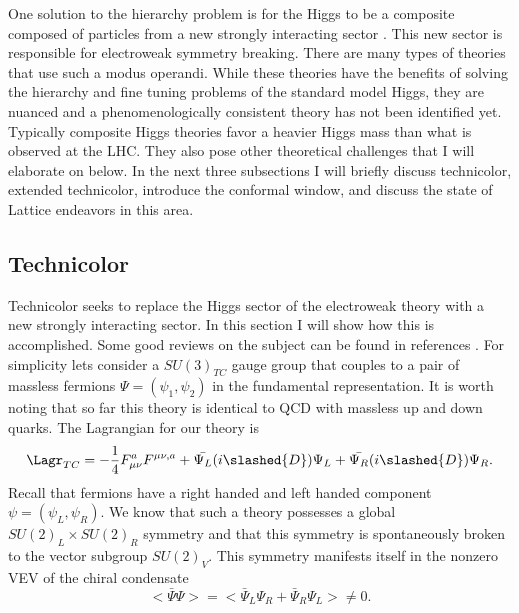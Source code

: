 
One solution to the hierarchy problem is for the Higgs to be a composite composed of particles from a new strongly interacting sector \cite{Kaplan:1983sm,Georgi:1984af,Weinberg:1975gm,Susskind:1978ms, Weinberg:1979bn, Eichten:1979ah, Dimopoulos:1979es}.
This new sector is responsible for electroweak symmetry breaking.
There are many types of theories that use such a modus operandi.
While these theories have the benefits of solving the hierarchy and fine tuning problems of the standard model Higgs, they are nuanced and a phenomenologically consistent theory has not been identified yet.
Typically composite Higgs theories favor a heavier Higgs mass than what is observed at the LHC.
They also pose other theoretical challenges that I will elaborate on below.
In the next three subsections I will briefly discuss technicolor, extended technicolor, introduce the conformal window, and discuss the state of Lattice endeavors in this area.

\subsection{Technicolor}

Technicolor seeks to replace the Higgs sector of the electroweak theory with a new strongly interacting sector.
In this section I will show how this is accomplished.
Some good reviews on the subject can be found in references \cite{Hill2003235,lane,Shrock:2007km,martin,Sannino:2009za}.
For simplicity lets consider a $SU(3)_{TC}$ gauge group that couples to a pair of massless fermions $\Psi=(\psi_1,\psi_2)$ in the fundamental representation.
It is worth noting that so far this theory is identical to QCD with massless up and down quarks.
The Lagrangian for our theory is
\begin{equation}
  \begin{aligned}
    \Lagr_{TC}=-\frac{1}{4}F^a_{\mu\nu}F^{\mu\nu,a}+\bar{\Psi_L}(i\slashed{D})\Psi_L+\bar{\Psi_R}(i\slashed{D})\Psi_R.
  \end{aligned}
\end{equation}
Recall that fermions have a right handed and left handed component $\psi=(\psi_L,\psi_R)$.
We know that such a theory possesses a global $SU(2)_L\times SU(2)_R$ symmetry and that this symmetry is spontaneously broken to the vector subgroup $SU(2)_V$.
This symmetry manifests itself in the nonzero VEV of the chiral condensate
\begin{equation}
  <\bar{\Psi}\Psi>=<\bar{\Psi}_L\Psi_R+\bar{\Psi}_R\Psi_L>\neq 0.
\end{equation}

